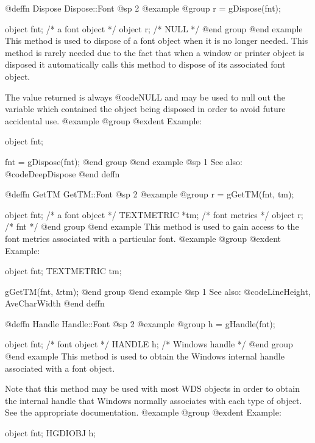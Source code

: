 @deffn {Dispose} Dispose::Font
@sp 2
@example
@group
r = gDispose(fnt);

object  fnt;   /*  a font object  */
object  r;     /*  NULL           */
@end group
@end example
This method is used to dispose of a font object when it is no longer
needed.  This method is rarely needed due to the fact that when a window
or printer object is disposed it automatically calls this method to
dispose of its associated font object.

The value returned is always @code{NULL} and may be used to null out
the variable which contained the object being disposed in order to
avoid future accidental use.
@example
@group
@exdent Example:

object  fnt;

fnt = gDispose(fnt);
@end group
@end example
@sp 1
See also:  @code{DeepDispose}
@end deffn










@deffn {GetTM} GetTM::Font
@sp 2
@example
@group
r = gGetTM(fnt, tm);

object      fnt;  /*  a font object  */
TEXTMETRIC  *tm;  /*  font metrics   */
object      r;    /*  fnt            */
@end group
@end example
This method is used to gain access to the font metrics associated with
a particular font.
@example
@group
@exdent Example:

object  fnt;
TEXTMETRIC  tm;

gGetTM(fnt, &tm);
@end group
@end example
@sp 1
See also:  @code{LineHeight, AveCharWidth}
@end deffn













@deffn {Handle} Handle::Font
@sp 2
@example
@group
h = gHandle(fnt);

object  fnt;    /*  font object     */
HANDLE  h;      /*  Windows handle  */
@end group
@end example
This method is used to obtain the Windows internal handle associated with
a font object.  

Note that this method may be used with most WDS objects in order to obtain
the internal handle that Windows normally associates with each type of object.
See the appropriate documentation.
@example
@group
@exdent Example:

object  fnt;
HGDIOBJ h;

